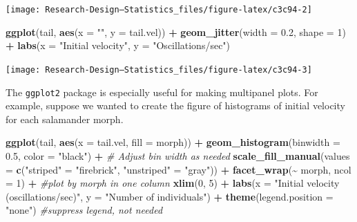 \documentclass[
]{book}
\newenvironment{Shaded}{\begin{snugshade}}{\end{snugshade}}
\newcommand{\AttributeTok}[1]{\textcolor[rgb]{0.13,0.29,0.53}{#1}}
\newcommand{\CommentTok}[1]{\textcolor[rgb]{0.56,0.35,0.01}{\textit{#1}}}
\newcommand{\DecValTok}[1]{\textcolor[rgb]{0.00,0.00,0.81}{#1}}
\newcommand{\FloatTok}[1]{\textcolor[rgb]{0.00,0.00,0.81}{#1}}
\newcommand{\FunctionTok}[1]{\textcolor[rgb]{0.13,0.29,0.53}{\textbf{#1}}}
\newcommand{\NormalTok}[1]{#1}
\newcommand{\OtherTok}[1]{\textcolor[rgb]{0.56,0.35,0.01}{#1}}
\newcommand{\SpecialCharTok}[1]{\textcolor[rgb]{0.81,0.36,0.00}{\textbf{#1}}}
\newcommand{\StringTok}[1]{\textcolor[rgb]{0.31,0.60,0.02}{#1}}
\begin{document}
\begin{center}\texttt{[image: Research-Design---Statistics\_files/figure-latex/c3c94-2]} \end{center}

\begin{Shaded}
\begin{Highlighting}[]
\FunctionTok{ggplot}\NormalTok{(tail, }\FunctionTok{aes}\NormalTok{(}\AttributeTok{x =} \StringTok{""}\NormalTok{, }\AttributeTok{y =}\NormalTok{ tail.vel)) }\SpecialCharTok{+}
  \FunctionTok{geom\_jitter}\NormalTok{(}\AttributeTok{width =} \FloatTok{0.2}\NormalTok{, }\AttributeTok{shape =} \DecValTok{1}\NormalTok{) }\SpecialCharTok{+} 
  \FunctionTok{labs}\NormalTok{(}\AttributeTok{x =} \StringTok{"Initial velocity"}\NormalTok{, }\AttributeTok{y =} \StringTok{"Oscillations/sec"}\NormalTok{)}
\end{Highlighting}
\end{Shaded}

\begin{center}\texttt{[image: Research-Design---Statistics\_files/figure-latex/c3c94-3]} \end{center}

The \texttt{ggplot2} package is especially useful for making multipanel plots. For example, suppose we wanted to create the figure of histograms of initial velocity for each salamander morph.

\begin{Shaded}
\begin{Highlighting}[]
\FunctionTok{ggplot}\NormalTok{(tail, }\FunctionTok{aes}\NormalTok{(}\AttributeTok{x =}\NormalTok{ tail.vel, }\AttributeTok{fill =}\NormalTok{ morph)) }\SpecialCharTok{+}
  \FunctionTok{geom\_histogram}\NormalTok{(}\AttributeTok{binwidth =} \FloatTok{0.5}\NormalTok{, }\AttributeTok{color =} \StringTok{"black"}\NormalTok{) }\SpecialCharTok{+}  \CommentTok{\# Adjust bin width as needed}
  \FunctionTok{scale\_fill\_manual}\NormalTok{(}\AttributeTok{values =} \FunctionTok{c}\NormalTok{(}\StringTok{"striped"} \OtherTok{=} \StringTok{"firebrick"}\NormalTok{, }\StringTok{"unstriped"} \OtherTok{=} \StringTok{"gray"}\NormalTok{)) }\SpecialCharTok{+}
  \FunctionTok{facet\_wrap}\NormalTok{(}\SpecialCharTok{\textasciitilde{}}\NormalTok{ morph, }\AttributeTok{ncol =} \DecValTok{1}\NormalTok{) }\SpecialCharTok{+}  \CommentTok{\#plot by morph in one column}
  \FunctionTok{xlim}\NormalTok{(}\DecValTok{0}\NormalTok{, }\DecValTok{5}\NormalTok{) }\SpecialCharTok{+}
  \FunctionTok{labs}\NormalTok{(}\AttributeTok{x =} \StringTok{"Initial velocity (oscillations/sec)"}\NormalTok{, }\AttributeTok{y =} \StringTok{"Number of individuals"}\NormalTok{) }\SpecialCharTok{+}
  \FunctionTok{theme}\NormalTok{(}\AttributeTok{legend.position =} \StringTok{"none"}\NormalTok{)  }\CommentTok{\#suppress legend, not needed}
\end{Highlighting}
\end{Shaded}
\end{document}
